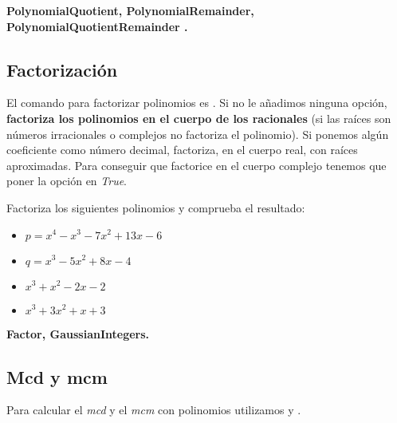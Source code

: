 \documentclass[a4paper,10pt, draft]{article}
\newcommand{\com}[1]{\textbf{\color{blue}{#1}}}
\newenvironment{ejer}{\begin{tcolorbox}[center title, title=Ejercicios,
fonttitle=\sffamily\bfseries,colback=blue!5,colframe=orange]}{\end{tcolorbox}}
\newenvironment{funciones}{\begin{tcolorbox}[center title, title=Nuevas funciones, fonttitle=\sffamily\bfseries, colback=green!5!white,colframe=red!75!black]}{\end{tcolorbox}\bigskip}
\begin{document}
\begin{funciones}

\textbf{PolynomialQuotient, PolynomialRemainder, PolynomialQuotientRemainder .}


\end{funciones} 
 
  \newpage
 
 \subsection{Factorización}

El comando para factorizar polinomios es \com{Factor[p]}. Si no le aña\-dimos ninguna opción, \textbf{factoriza los polinomios en el cuerpo de los racionales} (si las raíces son números irracionales o complejos no factoriza el polinomio). Si ponemos algún coeficiente como número decimal, factoriza, en el cuerpo real, con raíces aproximadas. Para conseguir que factorice en el cuerpo complejo tenemos que poner la opción \com{GaussianIntegers} en \textit{True}.


\begin{ejer}

Factoriza los siguientes polinomios y comprueba el resultado:


\begin{itemize}
\item $p= x^4-x^3-7x^2+13x-6 $

\item $ q= x^3-5x^2+8x-4$

\item $  x^3+x^2-2x-2$

\item $x^3+3x^2+x+3$

\end{itemize}

\end{ejer}  

\begin{funciones}

\textbf{Factor, GaussianIntegers.}


\end{funciones}


\newpage

\subsection{Mcd y mcm}

Para calcular el \textit{mcd} y el \textit{mcm} con polinomios utilizamos \com{PolynomialGCD[p,q,\dots]} y \com{PolynomialLCM[p,q,\dots]}.
\end{document}
